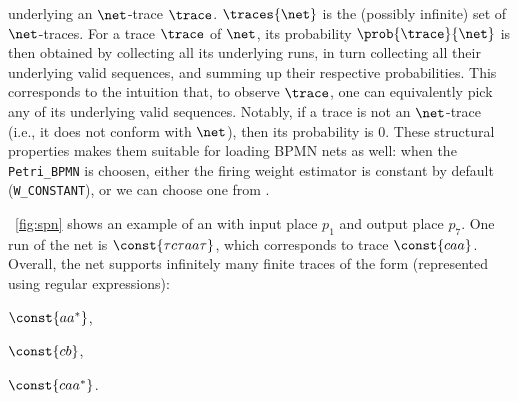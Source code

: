   underlying an $\net$-trace $\trace$. 
   $\traces{\net}$ is the (possibly infinite) set of $\net$-traces. For a trace $\trace$ of $\net$, its probability $\prob{\trace}{\net}$ is then obtained by collecting all its underlying runs, in turn collecting all their underlying valid sequences, and summing up their respective probabilities. %
    This corresponds to the intuition that, to observe $\trace$, one can equivalently pick any of its underlying valid sequences. Notably, if a trace is not an $\net$-trace (i.e., it does not conform with $\net$), then its probability is 0.
 These structural properties makes them suitable for loading BPMN nets as well: when the \texttt{Petri\_BPMN} is choosen, either the firing weight estimator is constant by default (\texttt{W\_CONSTANT}), or we can choose one from \cite{spdwe}. 
\begin{example} %
\label{ex:net}
\figurename~\ref{fig:spn} shows an example of an \uswn with input place $p_1$ and output place $p_7$. One run of the net is $\const{\tau c \tau a a \tau}$, which corresponds to trace $\const{caa}$. Overall, the net supports infinitely many finite traces of the form (represented using regular expressions):
\begin{inparaenum}[\it (i)]
\item $\const{aa^*}$,
\item $\const{cb}$,
\item $\const{caa^*}$.
\end{inparaenum}
\end{example}


